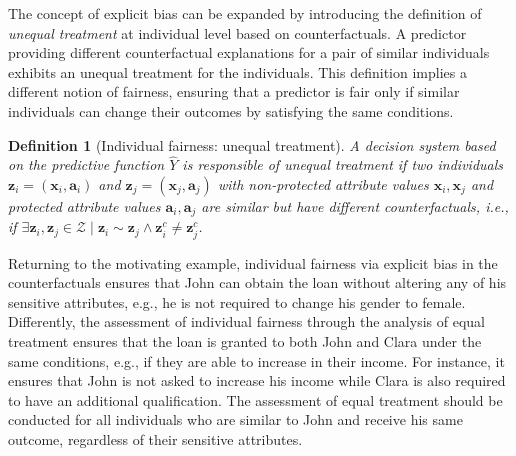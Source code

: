 \documentclass[letterpaper]{article} %
\newtheorem{definition}{Definition}
\begin{document}
The concept of explicit bias can be expanded by introducing the definition of \emph{unequal treatment} at individual level based on counterfactuals.
%
A predictor providing different counterfactual explanations for a pair of similar individuals exhibits an unequal treatment for the individuals.
%
This definition implies a different notion of fairness, ensuring that a predictor is fair only if similar individuals can change their outcomes by satisfying the same conditions. 

\begin{definition}[Individual fairness: unequal treatment]\label{unequal_treatment}
	A decision system based on the predictive function $\hat{Y}$ is responsible of \emph{unequal treatment} if two individuals $\boldsymbol{z}_i = (\boldsymbol{x}_i, \boldsymbol{a}_i)$ and $\boldsymbol{z}_j = (\boldsymbol{x}_j, \boldsymbol{a}_j)$ with non-protected attribute values $\boldsymbol{x}_i, \boldsymbol{x}_j$ and protected attribute values $\boldsymbol{a}_i, \boldsymbol{a}_j$ are similar but have different counterfactuals, i.e., if $\exists \boldsymbol{z}_i, \boldsymbol{z}_j \in \mathcal{Z} \mid \boldsymbol{z}_i \sim \boldsymbol{z}_j \wedge \boldsymbol{z}_i^c \neq \boldsymbol{z}_j^c$.
\end{definition}

Returning to the motivating example, individual fairness via explicit bias in the counterfactuals ensures that John can obtain the loan without altering any of his sensitive attributes, e.g., he is not required to change his gender to female.
%
Differently, the assessment of individual fairness through the analysis of equal treatment ensures that the loan is granted to both John and Clara under the same conditions, e.g., if they are able to increase in their income. For instance, it ensures that John is not asked to increase his income while Clara is also required to have an additional qualification.
%
The assessment of equal treatment should be conducted for all individuals who are similar to John and receive his same outcome, regardless of their sensitive attributes.
\end{document}
